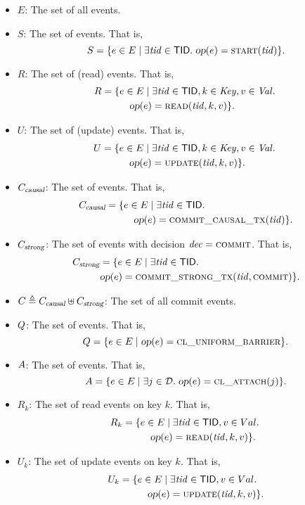 \begin{itemize}
  \item $E$: The set of all events.
  \item $S$: The set of \start{} events. That is,
    \[
      S = \{e \in E \mid \exists \mathit{tid} \in {\sf TID}.\;
        \textsl{op}(e) = \textsc{start}(\mathit{tid})\}.
    \]
  \item $R$: The set of \read{} (read) events. That is,
    \begin{align*}
      R = \{&e \in E \mid \exists \mathit{tid} \in {\sf TID}, k \in \mathit{Key}, v \in \mathit{Val}.\; \\
        &\quad \textsl{op}(e) = \textsc{read}(\mathit{tid}, k, v)\}.
    \end{align*}
  \item $U$: The set of \updateproc{} (update) events. That is,
    \begin{align*}
      U = \{&e \in E \mid \exists \mathit{tid} \in {\sf TID}, k \in \mathit{Key}, v \in \mathit{Val}.\; \\
        &\quad \textsl{op}(e) = \textsc{update}(\mathit{tid}, k, v)\}.
    \end{align*}
  \item $C_{\textsl{causal}}$: The set of \commitcausaltx{} events. That is,
    \begin{align*}
      C_{\textsl{causal}} = \{&e \in E \mid \exists \mathit{tid} \in {\sf TID}.\; \\
        &\quad \textsl{op}(e) = \textsc{commit\_causal\_tx}(\mathit{tid})\}.
    \end{align*}
  \item $C_{\textsl{strong}}$: The set of \commitstrongtx{} events
    with decision $\mathit{dec} = \textsc{commit}$. That is,
    \begin{align*}
      C_{\textsl{strong}} &= \{e \in E \mid \exists \mathit{tid} \in {\sf TID}.\; \\
        &\textsl{op}(e) = \textsc{commit\_strong\_tx}(\mathit{tid}, \textsc{commit})\}.
    \end{align*}

  \item $C \triangleq C_{\textsl{causal}} \uplus C_{\textsl{strong}}$:
    The set of all commit events.
  \item $Q$: The set of \fence{} events. That is,
    \[
      Q = \{e \in E \mid \textsl{op}(e) = \textsc{cl\_uniform\_barrier}\}.
    \]
  \item $A$: The set of \clattach{} events. That is,
    \[
      A = \{e \in E \mid \exists j \in \mathcal{D}.\; \textsl{op}(e) = \textsc{cl\_attach}(j)\}.
    \]
  \item $R_{k}$: The set of read events on key $k$. That is,
    \begin{align*}
      R_{k} = \{&e \in E \mid \exists \mathit{tid} \in {\sf TID}, v \in Val.\; \\
        &\quad \textsl{op}(e) = \textsc{read}(\mathit{tid}, k, v)\}.
    \end{align*}
  \item $U_{k}$: The set of update events on key $k$. That is,
    \begin{align*}
      U_{k} = \{&e \in E \mid \exists \mathit{tid} \in {\sf TID}, v \in Val.\; \\
        &\quad \textsl{op}(e) = \textsc{update}(\mathit{tid}, k, v)\}.
    \end{align*}
\end{itemize}

